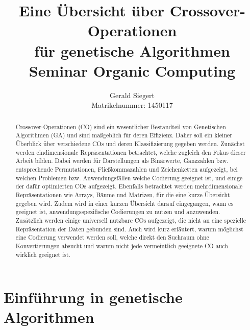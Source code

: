 \documentclass{llncs}
\begin{document}
	\mainmatter
	
	\title{Eine Übersicht über Crossover-Operationen\\
		für genetische Algorithmen\\
		Seminar Organic Computing}
	
	\author{Gerald Siegert\\
		Matrikelnummer: 1450117}
	\tocauthor{}
	
	
	\maketitle
	
	
	\begin{abstract}
		Crossover-Operationen (CO) sind ein wesentlicher Bestand\-teil von Genetischen Algorithmen (GA) und sind maßgeblich für deren Effizienz. Daher soll ein kleiner Überblick über verschiedene COs und deren Klassifizierung gegeben werden. Zunächst werden eindimensionale Re\-prä\-sen\-ta\-ti\-on\-en betrachtet, welche zugleich den Fokus dieser Arbeit bilden. Dabei werden für Darstellungen als Binärwerte, Ganzzahlen bzw. entsprechende Permutationen, Fließkommazahlen und Zeichenketten aufgezeigt, bei welchen Problemen bzw. Anwendungsfällen welche Codierung geeignet ist, und einige der dafür optimierten COs aufgezeigt. Ebenfalls betrachtet werden mehrdimensionale Re\-prä\-sen\-ta\-ti\-on\-en wie Arrays, Bäume und Matrizen, für die eine kurze Übersicht gegeben wird. Zudem wird in einer kurzen Übersicht darauf eingegangen, wann es geeignet ist, anwendungsspezifische Co\-die\-rungen zu nutzen und anzuwenden. Zu\-sätz\-lich werden  einige universell nutzbare COs aufgezeigt, die nicht an eine spezielle Repräsentation der Daten gebunden sind. Auch wird kurz erläutert, warum möglichst eine Codierung verwendet werden soll, welche direkt den Suchraum ohne Konvertierungen absucht und warum nicht jede vermeintlich geeignete CO auch wirklich geeignet ist.
	\end{abstract}
	
	\pagebreak
	
	\section{Einführung in genetische Algorithmen}
	\label{sec:EinfGA}
	
\end{document}
